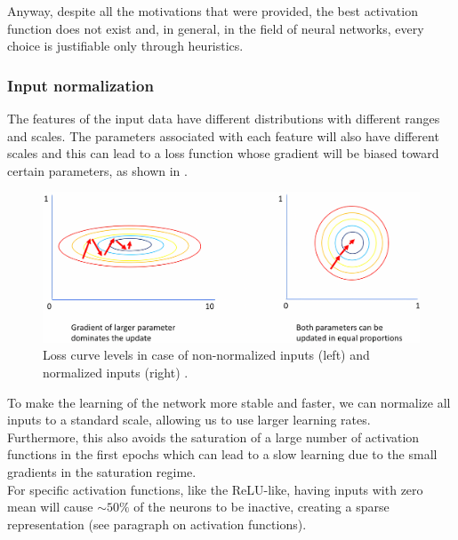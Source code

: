 Anyway, despite all the motivations that were provided, the best activation function does not exist and, in general, in the field of neural networks, every choice is justifiable only through heuristics.


\subsubsection*{Input normalization}
The features of the input data have different distributions with different ranges and scales. The parameters associated with each feature will also have different scales and this can lead to a loss function whose gradient will be biased toward certain parameters, as shown in .\\
\vspace{-0.5cm}
\begin{figure}[H]
    \hspace{-0.5cm}
    \centering
    \includegraphics[width=0.85\linewidth]{fig/chap05-stats/loss_norm_upscayl_2x_realesrgan-x4plus-anime.png}
    \vspace{0.5cm}
    \caption{Loss curve levels in case of non-normalized inputs (left) and normalized inputs (right) \cite{NormalizingNormalization.}.}
    \label{fig:loss_normalization}
    \vspace{-0.5cm}
\end{figure}
To make the learning of the network more stable and faster, we can normalize all inputs to a standard scale, allowing us to use larger learning rates.\\
Furthermore, this also avoids the saturation of a large number of activation functions in the first epochs which can lead to a slow learning due to the small gradients in the saturation regime.\\
For specific activation functions, like the ReLU-like, having inputs with zero mean will cause $\sim 50\%$ of the neurons to be inactive, creating a sparse representation (see paragraph on activation functions).\\
\\
